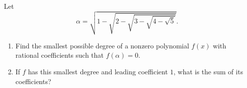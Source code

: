 Let
\[\alpha=\sqrt{1-\sqrt{2-\sqrt{3-\sqrt{4-\sqrt5}}}}.\]
\begin{enumerate}
\item[(a)] Find the smallest possible degree of a nonzero polynomial $f(x)$ with rational coefficients such that $f(\alpha)=0$.
\item[(b)] If $f$ has this smallest degree and leading coefficient $1$, what is the sum of its coefficients?
\end{enumerate}
